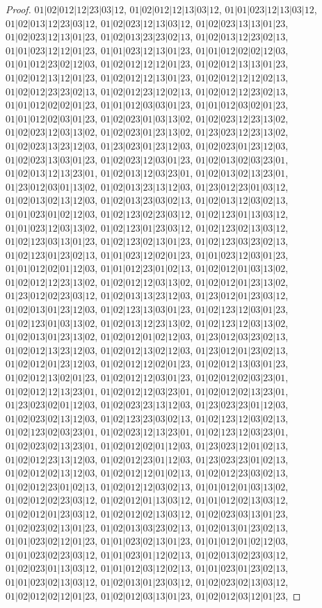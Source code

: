 \documentclass[12pt]{article}
\theoremstyle{plain}
\theoremstyle{definition}
\theoremstyle{remark}
\begin{document}
\begin{proof}
$01|02|012|12|23|03|12$, $01|02|012|12|13|03|12$, $01|01|023|12|13|03|12$, $01|02|013|12|23|03|12$, $01|02|023|12|13|03|12$, $01|02|023|13|13|01|23$, $01|02|023|12|13|01|23$, $01|02|013|23|23|02|13$, $01|02|013|12|23|02|13$, $01|01|023|12|12|01|23$, $01|01|023|12|13|01|23$, $01|01|012|02|02|12|03$, $01|01|012|23|02|12|03$, $01|02|012|12|12|01|23$, $01|02|012|13|13|01|23$, $01|02|012|13|12|01|23$, $01|02|012|12|13|01|23$, $01|02|012|12|12|02|13$, $01|02|012|23|23|02|13$, $01|02|012|23|12|02|13$, $01|02|012|12|23|02|13$, $01|01|012|02|02|01|23$, $01|01|012|03|03|01|23$, $01|01|012|03|02|01|23$, $01|01|012|02|03|01|23$, $01|02|023|01|03|13|02$, $01|02|023|12|23|13|02$, $01|02|023|12|03|13|02$, $01|02|023|01|23|13|02$, $01|23|023|12|23|13|02$, $01|02|023|13|23|12|03$, $01|23|023|01|23|12|03$, $01|02|023|01|23|12|03$, $01|02|023|13|03|01|23$, $01|02|023|12|03|01|23$, $01|02|013|02|03|23|01$, $01|02|013|12|13|23|01$, $01|02|013|12|03|23|01$, $01|02|013|02|13|23|01$, $01|23|012|03|01|13|02$, $01|02|013|23|13|12|03$, $01|23|012|23|01|03|12$, $01|02|013|02|13|12|03$, $01|02|013|23|03|02|13$, $01|02|013|12|03|02|13$, $01|01|023|01|02|12|03$, $01|02|123|02|23|03|12$, $01|02|123|01|13|03|12$, $01|01|023|12|03|13|02$, $01|02|123|01|23|03|12$, $01|02|123|02|13|03|12$, $01|02|123|03|13|01|23$, $01|02|123|02|13|01|23$, $01|02|123|03|23|02|13$, $01|02|123|01|23|02|13$, $01|01|023|12|02|01|23$, $01|01|023|12|03|01|23$, $01|01|012|02|01|12|03$, $01|01|012|23|01|02|13$, $01|02|012|01|03|13|02$, $01|02|012|12|23|13|02$, $01|02|012|12|03|13|02$, $01|02|012|01|23|13|02$, $01|23|012|02|23|03|12$, $01|02|013|13|23|12|03$, $01|23|012|01|23|03|12$, $01|02|013|01|23|12|03$, $01|02|123|13|03|01|23$, $01|02|123|12|03|01|23$, $01|02|123|01|03|13|02$, $01|02|013|12|23|13|02$, $01|02|123|12|03|13|02$, $01|02|013|01|23|13|02$, $01|02|012|01|02|12|03$, $01|23|012|03|23|02|13$, $01|02|012|13|23|12|03$, $01|02|012|13|02|12|03$, $01|23|012|01|23|02|13$, $01|02|012|01|23|12|03$, $01|02|012|12|02|01|23$, $01|02|012|13|03|01|23$, $01|02|012|13|02|01|23$, $01|02|012|12|03|01|23$, $01|02|012|02|03|23|01$, $01|02|012|12|13|23|01$, $01|02|012|12|03|23|01$, $01|02|012|02|13|23|01$, $01|23|023|02|01|12|03$, $01|02|023|23|13|12|03$, $01|23|023|23|01|12|03$, $01|02|023|02|13|12|03$, $01|02|123|23|03|02|13$, $01|02|123|12|03|02|13$, $01|02|123|02|03|23|01$, $01|02|023|12|13|23|01$, $01|02|123|12|03|23|01$, $01|02|023|02|13|23|01$, $01|02|012|02|01|12|03$, $01|23|023|12|01|02|13$, $01|02|012|23|13|12|03$, $01|02|012|23|01|12|03$, $01|23|023|23|01|02|13$, $01|02|012|02|13|12|03$, $01|02|012|12|01|02|13$, $01|02|012|23|03|02|13$, $01|02|012|23|01|02|13$, $01|02|012|12|03|02|13$, $01|01|012|01|03|13|02$, $01|02|012|02|23|03|12$, $01|02|012|01|13|03|12$, $01|01|012|02|13|03|12$, $01|02|012|01|23|03|12$, $01|02|012|02|13|03|12$, $01|02|023|03|13|01|23$, $01|02|023|02|13|01|23$, $01|02|013|03|23|02|13$, $01|02|013|01|23|02|13$, $01|01|023|02|12|01|23$, $01|01|023|02|13|01|23$, $01|01|012|01|02|12|03$, $01|01|023|02|23|03|12$, $01|01|023|01|12|02|13$, $01|02|013|02|23|03|12$, $01|02|023|01|13|03|12$, $01|01|012|03|12|02|13$, $01|01|023|01|23|02|13$, $01|01|023|02|13|03|12$, $01|02|013|01|23|03|12$, $01|02|023|02|13|03|12$, $01|02|012|02|12|01|23$, $01|02|012|03|13|01|23$, $01|02|012|03|12|01|23$, 
\end{proof}
\end{document}
